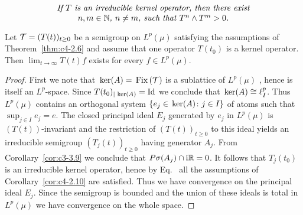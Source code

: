 \begin{equation}\label{eq:429}
\parbox{0.8\textwidth}{\centering\itshape
If $T$ is an irreducible kernel operator, then there exist 
$n,m \in \mathbb{N}$, $n \neq m$, such that $T^n \wedge T^m > 0$.}
\end{equation}
\begin{corollary}\label{cor:c4-2.11}%
%
Let $\TT = (T(t))_{t\geq 0}$ be a semigroup on $L^{p}(\mu)$ satisfying the assumptions of Theorem~\ref{thm:c4-2.6} and assume that one operator $T(t_{0})$ is a kernel operator.
Then $\lim_{t \to \infty}T(t)f$ exists for every $f \in L^{p}(\mu)$.
\end{corollary}
\begin{proof}
First we note that $\mathop{}\mathrm{ker}(A) = \mathop{}\mathrm{Fix}\left(\mathcal{T}\right)$ is a sublattice of $L^p(\mu)$ , hence is itself an $L^p$-space. 
Since $T(t_0)_{\vert \mathop{}\mathrm{ker}(A)} = \operatorname{Id}$  we conclude that  $\mathop{}\mathrm{ker}(A) \cong \ell^p_I$.   
Thus $L^p(\mu)$ contains an orthogonal system $\{e_j \in \mathop{}\mathrm{ker}(A) \colon j \in I\}$  of atoms such that $\sup_{j \in I} e_j = e$. 
The closed principal ideal $E_j$ generated by $e_j$ in  $L^p(\mu)$ is $(T(t))$-invariant and the restriction of $(T(t))_{t \geq 0}$  to this ideal yields an irreducible semigroup $(T_j(t))_{t \geq 0}$ having generator $A_j$. 
From Corollary~\ref{cor:c3-3.9}  we conclude that  $P\sigma(A_j) \cap \mathrm{i}\mathbb{R} = {0}$.  
It follows that $T_j(t_0)$ is an irreducible kernel operator, hence by Eq.~ all the assumptions of Corollary~\ref{cor:c4-2.10} are satisfied.
Thus we have convergence on the principal ideal $E_j$.  
Since the semigroup is bounded and the union of these ideals is total in  $L^p(\mu)$  we have convergence on the whole space.
\end{proof}

